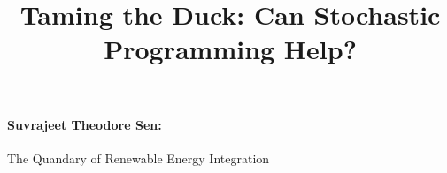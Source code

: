 

\setlength{\textheight}{23cm} %
\setlength{\topmargin}{-2cm}
\setlength{\textwidth}{17.5cm} \setlength{\oddsidemargin}{-0.5cm}
\setlength{\evensidemargin}{-0.5cm}

\setlength{\parindent}{0pt}

\newcommand{\gap}{\vspace{5pt}}
\newcommand{\epc}{\hspace{1pc}}

\newcommand{\onebld}{{\bf 1}}
\newcommand{\wt}{\widetilde}
\newcommand{\wh}{\widehat}

\newcommand{\E}{{\rm I\!E}}
\newcommand{\IP}{{\rm I\!P}}
\newcommand{\D}{{\rm I\!D}}
\newcommand{\pmat}[1]{\begin{pmatrix} #1 \end{pmatrix}}
\newcommand{\us}[1]{{\color{black}#1}}
\newcommand{\ssbs}[1]{{\color{blue}#1}}


\usepackage{mathtools}


\title{\bf Taming the Duck: Can Stochastic Programming Help?}
\date{}


\maketitle

\vspace*{-1.3cm}

\paragraph{Suvrajeet Theodore Sen:} 
The Quandary of Renewable Energy Integration

